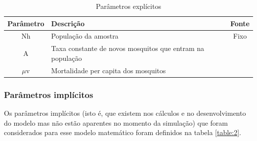 \documentclass[conference]{IEEEtran}
\begin{document}
\begin{table}[!ht]
\begin{tabular}{| c | L{5cm} | c |}
Parâmetro & Descrição & Fonte\\
 \hline\hline
 Nh & População da amostra  & Fixo \\ \hline
 A & Taxa constante de novos mosquitos que entram na população & \cite{10.1371/journal.pone.0049085} \\ \hline
 $\mu $v & Mortalidade per capita dos mosquitos & \cite{10.1371/journal.pone.0049085} \\ \hline
\end{tabular}
\caption{Parâmetros explícitos}
\label{table:1}
\end{table}

\subsubsection{Parâmetros implícitos} 

Os parâmetros implícitos (isto é, que existem nos cálculos e no desenvolvimento do modelo mas não estão aparentes no momento da simulação) que foram considerados para esse modelo matemático foram definidos na tabela \ref{table:2}.
\end{document}
